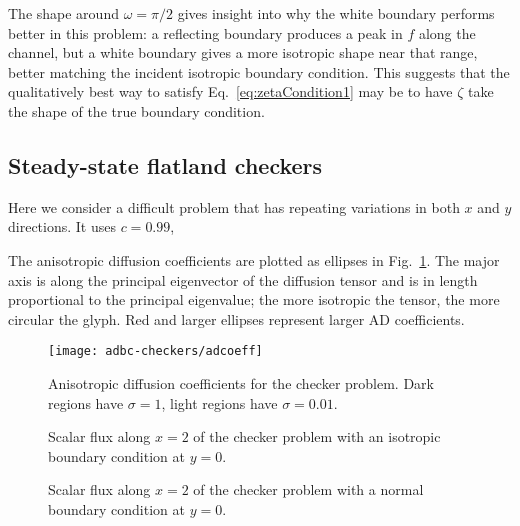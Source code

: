 The shape around $\omega=\pi/2$ gives insight into why the white boundary
performs better in this problem: a reflecting boundary produces a peak in $f$
along the channel, but a white boundary gives a more isotropic shape near that
range, better matching the incident isotropic boundary condition. This suggests
that the qualitatively best way to satisfy Eq.~\eqref{eq:zetaCondition1} may be
to have $\zeta$ take the shape of the true boundary condition.

\clearpage
\subsection{Steady-state flatland checkers}

Here we consider a difficult problem that has repeating variations in both $x$
and $y$ directions. It uses $c=0.99$, 

The anisotropic diffusion coefficients are plotted as ellipses in
Fig.~\ref{fig:bcCheckersAdcoeff}. The major axis is along the principal
eigenvector of the diffusion tensor and is in length proportional to the
principal eigenvalue; the more isotropic the tensor, the more circular the
glyph. Red and larger ellipses represent larger AD coefficients.

\begin{figure}[htb]
  \centering\small
  \texttt{[image: adbc-checkers/adcoeff]}
  \caption[Anisotropic diffusion coefficients for the checker problem.]{
  Anisotropic diffusion coefficients for the checker problem. Dark
  regions have $\sigma=1$, light regions have $\sigma=0.01$.}
  \label{fig:bcCheckersAdcoeff}
\end{figure}

\begin{figure}[htb]
  \centering\small
  \hspace{-.5in}
  
  \hspace{-.5in}
  \caption{Scalar flux along $x=2$ of the checker problem with an isotropic
  boundary condition at $y=0$.}
  \label{fig:bcCheckersIsotropic}
\end{figure}

\begin{figure}[htb]
  \centering\small
  \hspace{-.5in}
  
  \hspace{-.5in}
  \caption{Scalar flux along $x=2$ of the checker problem with a normal
  boundary condition at $y=0$.}
  \label{fig:bcCheckersDelta}
\end{figure}

